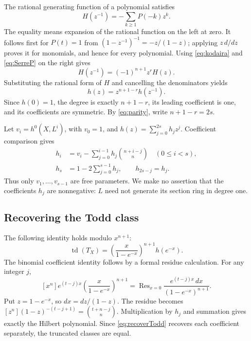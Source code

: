 \documentclass[11pt,reqno,letterpaper]{amsart}
\newcommand{\td}{\operatorname{td}}
\newcommand{\Res}{\operatorname{Res}}
\theoremstyle{definition}
\numberwithin{equation}{section}
\begin{document}
The rational generating function of a polynomial satisfies
\[
 H(z^{-1})=-\sum_{k\ge1}P(-k)z^k.
\]
The equality means expansion of the rational function on the left at zero.
It follows first for $P(t)=1$ from
$(1-z^{-1})^{-1}=-z/(1-z)$; applying $z\,d/dz$ proves it for monomials,
and hence for every polynomial. Using \eqref{eq:kodaira} and
\eqref{eq:SerreP} on the right gives
\[
 H(z^{-1})=(-1)^{n+1}z^rH(z).
\]
Substituting the rational form of $H$ and cancelling the denominators yields
\begin{equation}\label{eq:reciprocal}
 h(z)=z^{n+1-r}h(z^{-1}).
\end{equation}
Since $h(0)=1$, the degree is exactly $n+1-r$, its leading coefficient is
one, and its coefficients are symmetric.
By \eqref{eq:parity}, write $n+1-r=2s$.

Let $v_i=h^0(X,L^i)$, with $v_0=1$, and $h(z)=\sum_{j=0}^{2s}h_jz^j$.
Coefficient comparison gives
\begin{align}
 h_i&=v_i-\sum_{j=0}^{i-1}h_j\binom{n+i-j}{n}\quad(0\le i<s),\label{eq:hrec}\\
 h_s&=1-2\sum_{j=0}^{s-1}h_j,\qquad h_{2s-j}=h_j.\nonumber
\end{align}
Thus only $v_1,\ldots,v_{s-1}$ are free parameters.
We make no assertion that the coefficients $h_j$ are nonnegative:
$L$ need not generate its section ring in degree one.

\subsection{Recovering the Todd class}
The following identity holds modulo $x^{n+1}$:
\begin{equation}\label{eq:Todd-h}
 \td(T_X)=\left(\frac{x}{1-e^{-x}}\right)^{n+1}h(e^{-x}).
\end{equation}
The binomial coefficient identity follows by a formal residue calculation.
For any integer $j$,
\[
 [x^n]e^{(t-j)x}\left(\frac{x}{1-e^{-x}}\right)^{n+1}
 =\Res_{x=0}\frac{e^{(t-j)x}\,dx}{(1-e^{-x})^{n+1}}.
\]
Put $z=1-e^{-x}$, so $dx=dz/(1-z)$. The residue becomes
$[z^n](1-z)^{-(t-j+1)}=\binom{t+n-j}{n}$.
Multiplication by $h_j$ and summation gives exactly the Hilbert polynomial.
Since \eqref{eq:recoverTodd} recovers each coefficient separately, the
truncated classes are equal.
\end{document}
